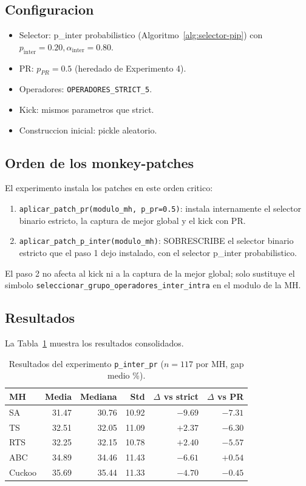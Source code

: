 \subsection{Configuracion}

\begin{itemize}
\item Selector: p\_inter probabilistico (Algoritmo~\ref{alg:selector-pip})
  con $p_{\text{inter}} = 0.20, \alpha_{\text{inter}} = 0.80$.
\item PR: $p_{PR} = 0.5$ (heredado de Experimento 4).
\item Operadores: \texttt{OPERADORES\_STRICT\_5}.
\item Kick: mismos parametros que strict.
\item Construccion inicial: pickle aleatorio.
\end{itemize}

\subsection{Orden de los monkey-patches}

El experimento instala los patches en este orden critico:

\begin{enumerate}
\item \texttt{aplicar\_patch\_pr(modulo\_mh, p\_pr=0.5)}: instala
  internamente el selector binario estricto, la captura de mejor
  global y el kick con PR.
\item \texttt{aplicar\_patch\_p\_inter(modulo\_mh)}: SOBRESCRIBE el
  selector binario estricto que el paso 1 dejo instalado, con el
  selector p\_inter probabilistico.
\end{enumerate}

El paso 2 no afecta al kick ni a la captura de la mejor global; solo
sustituye el simbolo
\texttt{seleccionar\_grupo\_operadores\_inter\_intra} en el modulo de
la MH.

\subsection{Resultados}

La Tabla~\ref{tab:pip-resultados} muestra los resultados consolidados.

\begin{table}[h]
\centering
\caption{Resultados del experimento \texttt{p\_inter\_pr} ($n=117$ por MH, gap medio \%).}
\label{tab:pip-resultados}
\small
\begin{tabular}{lrrrrr}
\toprule
MH & Media & Mediana & Std & $\Delta$ vs strict & $\Delta$ vs PR \\
\midrule
SA      & 31.47 & 30.76 & 10.92 & $-9.69$ & $-7.31$ \\
TS      & 32.51 & 32.05 & 11.09 & $+2.37$ & $-6.30$ \\
RTS     & 32.25 & 32.15 & 10.78 & $+2.40$ & $-5.57$ \\
ABC     & 34.89 & 34.46 & 11.43 & $-6.61$ & $+0.54$ \\
Cuckoo  & 35.69 & 35.44 & 11.33 & $-4.70$ & $-0.45$ \\
\bottomrule
\end{tabular}
\end{table}

